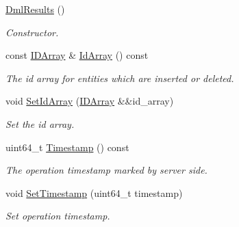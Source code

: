 \begin{DoxyCompactItemize}
\item 
\mbox{\label{classmilvus_1_1_dml_results_a086b83fbe3bb8b15bd5849f05be045df}} 
\hyperlink{classmilvus_1_1_dml_results_a086b83fbe3bb8b15bd5849f05be045df}{Dml\+Results} ()
\begin{DoxyCompactList}\small\item\em Constructor. \end{DoxyCompactList}\item 
\mbox{\label{classmilvus_1_1_dml_results_a615fe477fede81255f77507a5a8e28f6}} 
const \hyperlink{classmilvus_1_1_i_d_array}{I\+D\+Array} \& \hyperlink{classmilvus_1_1_dml_results_a615fe477fede81255f77507a5a8e28f6}{Id\+Array} () const
\begin{DoxyCompactList}\small\item\em The id array for entities which are inserted or deleted. \end{DoxyCompactList}\item 
\mbox{\label{classmilvus_1_1_dml_results_a2dbc2bb23485ea853934f31d647355c8}} 
void \hyperlink{classmilvus_1_1_dml_results_a2dbc2bb23485ea853934f31d647355c8}{Set\+Id\+Array} (\hyperlink{classmilvus_1_1_i_d_array}{I\+D\+Array} \&\&id\+\_\+array)
\begin{DoxyCompactList}\small\item\em Set the id array. \end{DoxyCompactList}\item 
\mbox{\label{classmilvus_1_1_dml_results_a6b87cdaf3663ed38a57a6a2c3bf77991}} 
uint64\+\_\+t \hyperlink{classmilvus_1_1_dml_results_a6b87cdaf3663ed38a57a6a2c3bf77991}{Timestamp} () const
\begin{DoxyCompactList}\small\item\em The operation timestamp marked by server side. \end{DoxyCompactList}\item 
\mbox{\label{classmilvus_1_1_dml_results_a62f4a7da55812f45b4967a04f2dfe651}} 
void \hyperlink{classmilvus_1_1_dml_results_a62f4a7da55812f45b4967a04f2dfe651}{Set\+Timestamp} (uint64\+\_\+t timestamp)
\begin{DoxyCompactList}\small\item\em Set operation timestamp. \end{DoxyCompactList}\end{DoxyCompactItemize}


